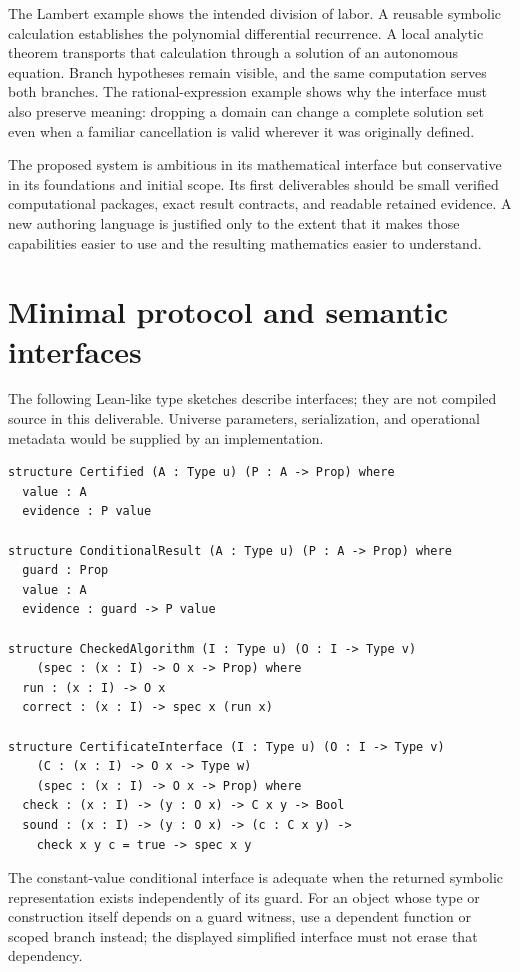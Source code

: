 \documentclass[11pt,a4paper]{article}
\theoremstyle{remark}
\begin{document}
The Lambert example shows the intended division of labor. A reusable symbolic
calculation establishes the polynomial differential recurrence. A local analytic
theorem transports that calculation through a solution of an autonomous equation.
Branch hypotheses remain visible, and the same computation serves both branches.
The rational-expression example shows why the interface must also preserve
meaning: dropping a domain can change a complete solution set even when a
familiar cancellation is valid wherever it was originally defined.

The proposed system is ambitious in its mathematical interface but conservative
in its foundations and initial scope. Its first deliverables should be small
verified computational packages, exact result contracts, and readable retained
evidence. A new authoring language is justified only to the extent that it makes
those capabilities easier to use and the resulting mathematics easier to
understand.

\appendix
{}
\section{Minimal protocol and semantic interfaces}
\label{app:interfaces}
The following Lean-like type sketches describe interfaces; they are not compiled
source in this deliverable. Universe parameters, serialization, and operational
metadata would be supplied by an implementation.
\par\smallskip\noindent\begin{minipage}{\linewidth}
\begin{lstlisting}
structure Certified (A : Type u) (P : A -> Prop) where
  value : A
  evidence : P value

structure ConditionalResult (A : Type u) (P : A -> Prop) where
  guard : Prop
  value : A
  evidence : guard -> P value

structure CheckedAlgorithm (I : Type u) (O : I -> Type v)
    (spec : (x : I) -> O x -> Prop) where
  run : (x : I) -> O x
  correct : (x : I) -> spec x (run x)

structure CertificateInterface (I : Type u) (O : I -> Type v)
    (C : (x : I) -> O x -> Type w)
    (spec : (x : I) -> O x -> Prop) where
  check : (x : I) -> (y : O x) -> C x y -> Bool
  sound : (x : I) -> (y : O x) -> (c : C x y) ->
    check x y c = true -> spec x y
\end{lstlisting}
\end{minipage}\par\smallskip
The constant-value conditional interface is adequate when the returned symbolic
representation exists independently of its guard. For an object whose type or
construction itself depends on a guard witness, use a dependent function or
scoped branch instead; the displayed simplified interface must not erase that
dependency.
\end{document}
